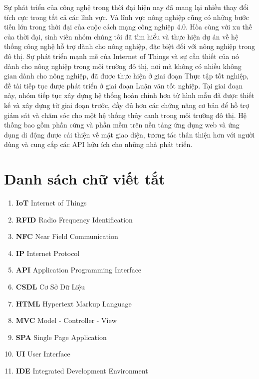 \documentclass[a4paper,12pt,oneside]{article}
\begin{document}
Sự phát triển của công nghệ trong thời đại hiện nay đã  mang lại nhiều thay đổi tích cực trong tất cả các lĩnh vực. Và lĩnh vực nông nghiệp cũng có những bước tiến lớn trong thời đại của cuộc cách mạng công nghiệp 4.0. Hòa cùng với xu thế của thời đại, sinh viên nhóm chúng tôi đã tìm hiểu và thực hiện dự án về hệ thống công nghệ hỗ trợ dành cho nông nghiệp, đặc biệt đối với nông nghiệp trong đô thị. Sự phát triển mạnh mẽ của Internet of Things và sự cần thiết của nó dành cho nông nghiệp trong môi trường đô thị, nơi mà không có nhiều không gian dành cho nông nghiệp, đã được thực hiện ở giai đoạn Thực tập tốt nghiệp, đề tài tiếp tục được phát triển ở giai đoạn Luận văn tốt nghiệp. Tại giai đoạn này, nhóm tiếp tục xây dựng hệ thống hoàn chỉnh hơn từ hình mẫu đã được thiết kế và xây dựng từ giai đoạn trước, đầy đủ hơn các chứng năng cơ bản để hỗ trợ giám sát và chăm sóc cho một hệ thống thủy canh trong môi trường đô thị. Hệ thống bao gồm phần cứng và phần mềm trên nền tảng ứng dụng web và ứng dụng di động được cải thiện về mặt giao diện, tương tác thân thiện hơn với người dùng và cung cấp các API hữu ích cho những nhà phát triển.

\newpage
\tableofcontents

\newpage
\listoffigures

\newpage
\listoftables

\newpage
\section*{Danh sách chữ viết tắt}
\label{sec:dsvt}

\begin{enumerate}
\item \textbf{IoT} Internet of Things
\item \textbf{RFID} Radio Frequency Identification
\item \textbf{NFC} Near Field Communication
\item \textbf{IP} Internet Protocol
\item \textbf{API} Application Programming Interface
\item \textbf{CSDL} Cơ Sở Dữ Liệu
\item \textbf{HTML} Hypertext Markup Language
\item \textbf{MVC} Model - Controller - View
\item \textbf{SPA} Single Page Application
\item \textbf{UI} User Interface
\item \textbf{IDE} Integrated Development Environment
\end{enumerate}
\end{document}
